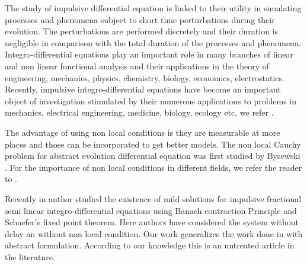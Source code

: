 \documentclass[11pt]{article}
\begin{document}
\par The study of impulsive differential equation is linked to their utility in simulating processes and phenomena subject to short time perturbations during their evolution. The perturbations are performed discretely and their duration is negligible in comparison with the total duration of the processes and phenomena. Integro-differential equations play an important role in many branches of linear and non linear functional analysis and their applications in the theory of engineering, mechanics, physics, chemistry, biology, economics, electrostatics. Recently, impulsive integro-differential equations have become an important object of investigation stimulated by  their  numerous applications to problems in mechanics, electrical engineering, medicine,  biology, ecology etc, we refer \cite{her,deb,shu,bala,ben,ras,ravi,kha}.

\par The advantage of using non local conditions is they are measurable at more places and those can be incorporated to get better models. The non local Cauchy problem for abstract evolution differential equation was first studied by Bysewski \cite{bys}. For the importance of non local conditions in different fields, we refer the reader to \cite{moph1,xia,bys1,benc}.

\par Recently in \cite{qin} author studied the existence of mild solutions for impulsive fractional semi linear integro-differential equations using Banach contraction Principle and Schaefer's fixed point theorem. Here authors have considered the system without delay an without non local condition. Our work generalizes the work done in \cite{qin} with abstract formulation. According to our knowledge this is an untreated article in the literature. 
\end{document}
